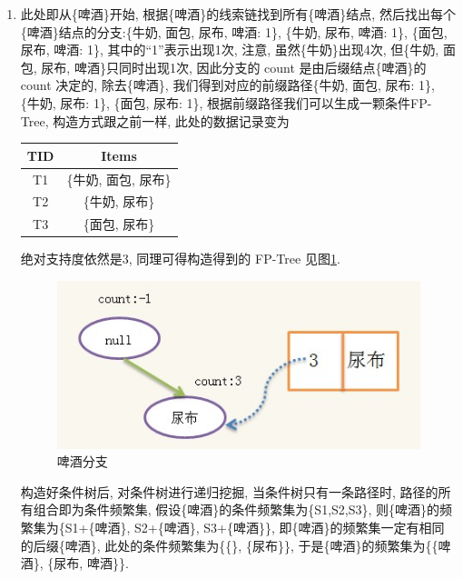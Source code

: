 \documentclass[a4paper,UTF8]{ctexart}
\theoremstyle{plain} \newtheorem{theorem}{定理}[section]
\theoremstyle{plain} \newtheorem{definition}{定义}[section]
\theoremstyle{plain} \newtheorem{lemma}{引理}[section]
\theoremstyle{plain} \newtheorem{proposition}{命题}[section]
\theoremstyle{plain} \newtheorem{example}{例}[section]
\theoremstyle{plain} \newtheorem{remark}{注}[section]
\theoremstyle{plain} \newtheorem{corollary}{推论}[section]
\begin{document}
\begin{enumerate}[(1)]
\item 此处即从\{啤酒\}开始, 根据\{啤酒\}的线索链找到所有\{啤酒\}结点, 然后找出每个\{啤酒\}结点的分支:\{牛奶, 面包, 尿布, 啤酒: 1\}, \{牛奶, 尿布, 啤酒: 1\}, \{面包, 尿布, 啤酒: 1\}, 其中的“1”表示出现1次, 注意, 虽然\{牛奶\}出现4次, 但\{牛奶, 面包, 尿布, 啤酒\}只同时出现1次, 因此分支的 count 是由后缀结点\{啤酒\}的 count 决定的, 除去\{啤酒\}, 我们得到对应的前缀路径\{牛奶, 面包, 尿布: 1\}, \{牛奶, 尿布: 1\}, \{面包, 尿布: 1\}, 根据前缀路径我们可以生成一颗条件FP-Tree, 构造方式跟之前一样, 此处的数据记录变为
\begin{table}[!htb]
\centering
\label{fp1}
\begin{tabular}{c|c}
	\hline
    \textbf{TID} & \textbf{Items}  \\
    \hline
    T1   &  \{牛奶, 面包, 尿布\}  \\
    \hline
    T2   &  \{牛奶, 尿布\} \\
    \hline
    T3   &  \{面包, 尿布\}  \\
	\hline
\end{tabular}
\end{table}

绝对支持度依然是$3$, 同理可得构造得到的 FP-Tree 见图\ref{ar1}.
\begin{figure}[!htb]
	\centering
	\includegraphics[width = 0.80 \textwidth]{ar1.jpg}
	\caption{啤酒分支}
	\label{ar1}
\end{figure}

构造好条件树后, 对条件树进行递归挖掘, 当条件树只有一条路径时, 路径的所有组合即为条件频繁集, 假设\{啤酒\}的条件频繁集为\{S1,S2,S3\}, 则\{啤酒\}的频繁集为\{S1+\{啤酒\}, S2+\{啤酒\}, S3+\{啤酒\}\}, 即\{啤酒\}的频繁集一定有相同的后缀\{啤酒\}, 此处的条件频繁集为\{\{\}, \{尿布\}\}, 于是\{啤酒\}的频繁集为\{\{啤酒\}, \{尿布, 啤酒\}\}.


\end{enumerate}
\end{document}
